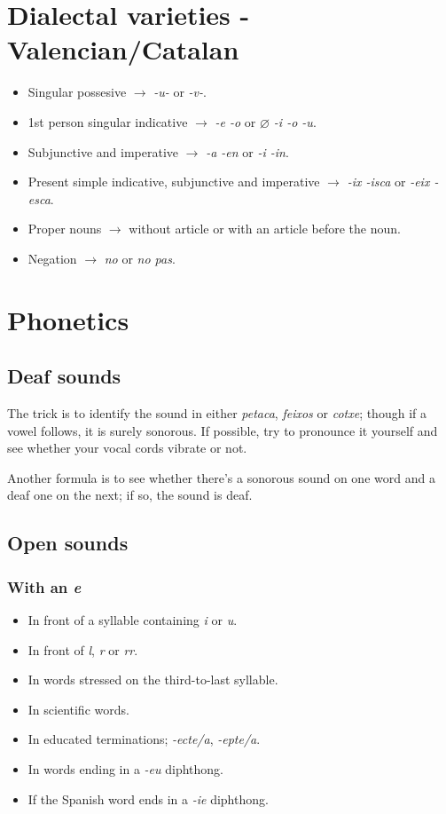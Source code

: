 \documentclass{article}
\begin{document}
\section*{Dialectal varieties - Valencian/Catalan}

\begin{itemize}
    \item Singular possesive $\rightarrow$ \emph{-u-} or \emph{-v-}.
    \item 1st person singular indicative $\rightarrow$ \emph{-e -o} or
    \emph{$\varnothing$ -i -o -u}.
    \item Subjunctive and imperative $\rightarrow$ \emph{-a -en} or
    \emph{-i -in}.
    \item Present simple indicative, subjunctive and imperative $\rightarrow$
    \emph{-ix -isca} or \emph{-eix -esca}.
    \item Proper nouns $\rightarrow$ without article or with an article before
    the noun.
    \item Negation $\rightarrow$ \emph{no} or \emph{no pas}.
\end{itemize}

\section*{Phonetics}

\subsection*{Deaf sounds}

The trick is to identify the sound in either \emph{petaca}, \emph{feixos} or
\emph{cotxe}; though if a vowel follows, it is surely sonorous.
If possible, try to pronounce it yourself and see whether your vocal cords
vibrate or not.

Another formula is to see whether there's a sonorous sound on one word and a
deaf one on the next; if so, the sound is deaf.

\subsection*{Open sounds}

\subsubsection*{With an \emph{e}}

\begin{itemize}
    \item In front of a syllable containing \emph{i} or \emph{u}.
    \item In front of \emph{l}, \emph{r} or \emph{rr}.
    \item In words stressed on the third-to-last syllable.
    \item In scientific words.
    \item In educated terminations; \emph{-ecte/a}, \emph{-epte/a}.
    \item In words ending in a \emph{-eu} diphthong.
    \item If the Spanish word ends in a \emph{-ie} diphthong.
\end{itemize}
\end{document}
